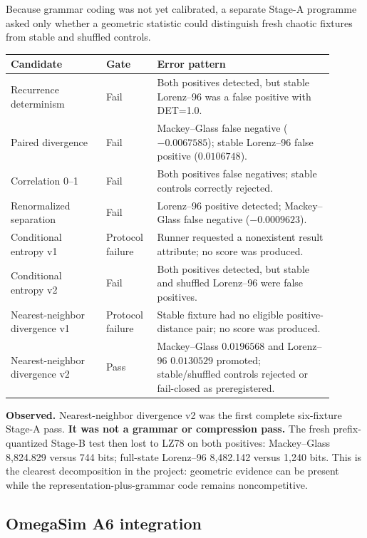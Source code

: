 \documentclass[10pt]{article}
\newcommand{\obs}{\textbf{Observed.}}
\begin{document}
Because grammar coding was not yet calibrated, a separate Stage-A programme
asked only whether a geometric statistic could distinguish fresh chaotic
fixtures from stable and shuffled controls.

\begin{longtable}{p{0.27\linewidth}p{0.13\linewidth}p{0.50\linewidth}}
\toprule
Candidate & Gate & Error pattern \\
\midrule
\endhead
Recurrence determinism & Fail & Both positives detected, but stable
Lorenz--96 was a false positive with DET=1.0. \\
Paired divergence & Fail & Mackey--Glass false negative
($-0.0067585$); stable Lorenz--96 false positive ($0.0106748$). \\
Correlation 0--1 & Fail & Both positives false negatives; stable controls
correctly rejected. \\
Renormalized separation & Fail & Lorenz--96 positive detected; Mackey--Glass
false negative ($-0.0009623$). \\
Conditional entropy v1 & Protocol failure & Runner requested a nonexistent
result attribute; no score was produced. \\
Conditional entropy v2 & Fail & Both positives detected, but stable and
shuffled Lorenz--96 were false positives. \\
Nearest-neighbor divergence v1 & Protocol failure & Stable fixture had no
eligible positive-distance pair; no score was produced. \\
Nearest-neighbor divergence v2 & Pass & Mackey--Glass $0.0196568$ and
Lorenz--96 $0.0130529$ promoted; stable/shuffled controls rejected or
fail-closed as preregistered. \\
\bottomrule
\end{longtable}

\obs{} Nearest-neighbor divergence v2 was the first complete six-fixture
Stage-A pass. \textbf{It was not a grammar or compression pass.} The fresh
prefix-quantized Stage-B test then lost to LZ78 on both positives:
Mackey--Glass 8,824.829 versus 744 bits; full-state Lorenz--96 8,482.142
versus 1,240 bits. This is the clearest decomposition in the project:
geometric evidence can be present while the representation-plus-grammar code
remains noncompetitive.

\subsection{OmegaSim A6 integration}
\end{document}
